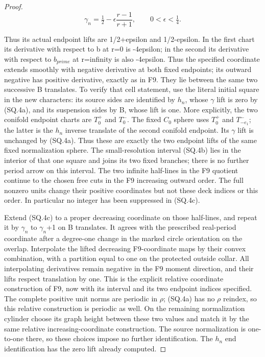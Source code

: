 \begin{proof}
\[
 \gamma_n=\tfrac12-\epsilon\frac{r-1}{r+1},
                       \qquad0<\epsilon<\tfrac14.       \tag{SQ.4c}
\]

Thus its actual endpoint lifts are 1/2+epsilon and 1/2-epsilon.
In the first chart its derivative with respect to b at r=0 is
-4epsilon; in the second its derivative with respect to \(b_{prime}\) at
r=infinity is also -4epsilon. Thus the specified coordinate extends
smoothly with negative derivative at both fixed endpoints; its
outward negative has positive derivative, exactly as in F9.
They lie between the same two successive B translates. To verify
that cell statement, use the literal initial square in the new
characters: its source sides are identified by \(h_{n}\), whose \(\gamma\)
lift is zero by (SQ.4a), and its suspension sides by B, whose lift
is one. More explicitly, the two conifold endpoint charts are \(T^+_0\) and
\(T^-_0\). The fixed \(C_{0}\) sphere uses \(T^+_0\) and
\(T^-_{-e_1}\); the latter is the \(h_{n}\) inverse translate of the
second conifold endpoint. Its \(\gamma\) lift is unchanged by (SQ.4a).
Thus these are exactly the two endpoint lifts of the same fixed
normalization sphere. The small-resolution interval (SQ.4b) lies in the interior
of that one square and joins its two fixed branches; there is no
further period arrow on this interval. The two infinite half-lines
in the F9 quotient continue to the chosen free cuts in the
F9 increasing outward order. The full nonzero units change their positive
coordinates but not these deck indices or this order. In particular
no integer has been suppressed in (SQ.4c).

Extend (SQ.4c) to a proper decreasing coordinate on those half-lines,
and repeat it by \(\gamma_{n}\) to \(\gamma_{n}\)+1 on B translates. It agrees
with the prescribed real-period coordinate after a degree-one change in the marked circle orientation
on the overlap. Interpolate the lifted decreasing F9-coordinate
maps by their convex combination, with a partition equal to one
on the protected outside collar. All interpolating derivatives
remain negative in the F9 moment direction, and their lifts respect translation by one.
This is the explicit relative coordinate construction of F9, now
with its interval and its two endpoint indices specified. The
complete positive unit norms are periodic in \(\rho\); (SQ.4a) has no
\(\rho\) reindex, so this relative construction is periodic as well.
On the remaining normalization cylinder choose its graph height
between these two values and match it by the same relative
increasing-coordinate construction. The source normalization is
one-to-one there, so these choices impose no further identification.
The \(h_{n}\) end identification has the zero lift already computed.


\end{proof}
